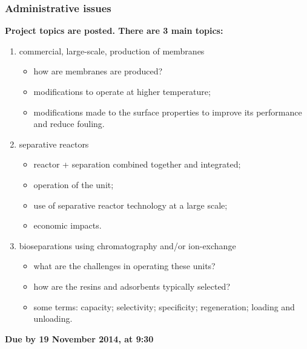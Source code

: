 \begin{frame}\frametitle{Administrative issues}
	\textbf{Project topics are posted. There are 3 main topics: }
		\begin{enumerate}
			\item	commercial, large-scale, production of membranes
				\begin{itemize}
					\item	how are membranes are produced?
					\item	modifications to operate at higher temperature;
					\item	modifications made to the surface properties to improve its performance and reduce fouling.
				\end{itemize}
			\item	separative reactors
			\begin{itemize}
				\item	reactor + separation combined together and integrated;
				\item	operation of the unit; 
				\item	use of separative reactor technology at a large scale;
				\item	economic impacts.
			\end{itemize}
			\item	bioseparations using chromatography and/or ion-exchange
			\begin{itemize}
				\item	what are the challenges in operating these units? 
				\item	how are the resins and adsorbents typically selected?
				\item	some terms: capacity; selectivity; specificity; regeneration; loading and unloading.
			\end{itemize}
		\end{enumerate}
	\textbf{Due by 19 November 2014, at 9:30}
	
\end{frame}

